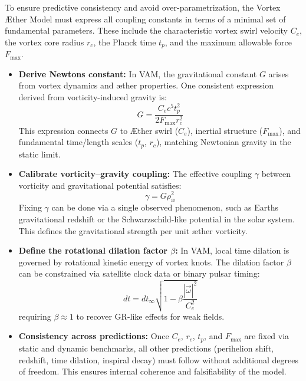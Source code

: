 To ensure predictive consistency and avoid over-parametrization, the Vortex Æther Model must express all coupling constants in terms of a minimal set of fundamental parameters. These include the characteristic vortex swirl velocity $C_e$, the vortex core radius $r_c$, the Planck time $t_p$, and the maximum allowable force $F_{\max}$.

\begin{itemize}
    \item \textbf{Derive Newton\rqs s constant:} In VAM, the gravitational constant $G$ arises from vortex dynamics and æther properties. One consistent expression derived from vorticity-induced gravity is:
    \begin{equation}
        G = \frac{C_e c^5 t_p^2}{2 F_{\max} r_c^2}
    \end{equation}
    This expression connects $G$ to Æther swirl ($C_e$), inertial structure ($F_{\max}$), and fundamental time/length scales ($t_p$, $r_c$), matching Newtonian gravity in the static limit.

    \item \textbf{Calibrate vorticity–gravity coupling:} The effective coupling $\gamma$ between vorticity and gravitational potential satisfies:
    \begin{equation}
        \gamma = G \rho_\text{\ae}^2
    \end{equation}
    Fixing $\gamma$ can be done via a single observed phenomenon, such as Earth\rqs s gravitational redshift or the Schwarzschild-like potential in the solar system. This defines the gravitational strength per unit æther vorticity.

    \item \textbf{Define the rotational dilation factor $\beta$:} In VAM, local time dilation is governed by rotational kinetic energy of vortex knots. The dilation factor $\beta$ can be constrained via satellite clock data or binary pulsar timing:
    \[
    dt = dt_\infty \sqrt{1 - \beta \frac{|\vec{\omega}|^2}{C_e^2}}
    \]
    requiring $\beta \approx 1$ to recover GR-like effects for weak fields.

    \item \textbf{Consistency across predictions:} Once $C_e$, $r_c$, $t_p$, and $F_{\max}$ are fixed via static and dynamic benchmarks, all other predictions (perihelion shift, redshift, time dilation, inspiral decay) must follow without additional degrees of freedom. This ensures internal coherence and falsifiability of the model.
\end{itemize}


